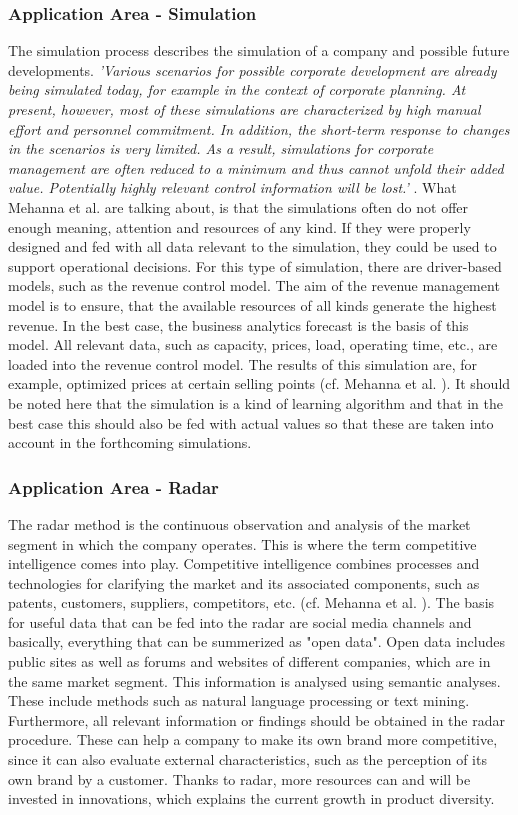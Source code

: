 \documentclass[12pt,twocolumn,twoside]{conference}   %
\begin{document}
\subsubsection{Application Area - Simulation}
The simulation process describes the simulation of a company and possible future developments. \textit{'Various scenarios for possible corporate development are already being simulated today, for example in the context of corporate planning. At present, however, most of these simulations are characterized by high manual effort and personnel commitment. In addition, the short-term response to changes in the scenarios is very limited. As a result, simulations for corporate management are often reduced to a minimum and thus cannot unfold their added value. Potentially highly relevant control information will be lost.'} \cite{2}. What Mehanna et al. are talking about, is that the simulations often do not offer enough meaning, attention and resources of any kind. If they were properly designed and fed with all data relevant to the simulation, they could be used to support operational decisions. For this type of simulation, there are driver-based models, such as the revenue control model. The aim of the revenue management model is to ensure, that the available resources of all kinds generate the highest revenue. In the best case, the business analytics forecast is the basis of this model. All relevant data, such as capacity, prices, load, operating time, etc., are loaded into the revenue control model. The results of this simulation are, for example, optimized prices at certain selling points (cf. Mehanna et al. \cite{2}). It should be noted here that the simulation is a kind of learning algorithm and that in the best case this should also be fed with actual values so that these are taken into account in the forthcoming simulations. 


\subsubsection{Application Area - Radar}
The radar method is the continuous observation and analysis of the market segment in which the company operates. This is where the term competitive intelligence comes into play. Competitive intelligence combines processes and technologies for clarifying the market and its associated components, such as patents, customers, suppliers, competitors, etc. (cf. Mehanna et al. \cite{2}). The basis for useful data that can be fed into the radar are social media channels and basically, everything that can be summerized as "open data". Open data includes public sites as well as forums and websites of different companies, which are in the same market segment. This information is analysed using semantic analyses. These include methods such as natural language processing or text mining. Furthermore, all relevant information or findings should be obtained in the radar procedure. These can help a company to make its own brand more competitive, since it can also evaluate external characteristics, such as the perception of its own brand by a customer. Thanks to radar, more resources can and will be invested in innovations, which explains the current growth in product diversity.
\end{document}
